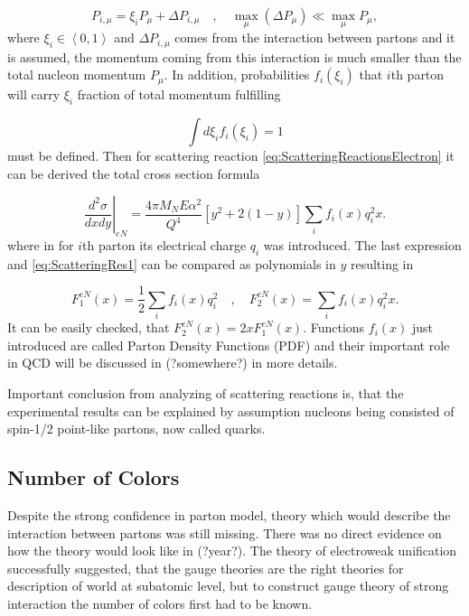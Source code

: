 \documentclass[a4paper,11pt]{report}
\begin{document}
\begin{equation}
  P_{i,\mu} = \xi_i P_\mu + \Delta P_{i,\mu} 
    \quad , \quad \max_\mu (\Delta P_\mu) \ll \max_\mu P_\mu,
  \label{PartonsMomentumDistriburtionAssumption}
\end{equation}
where $\xi_i \in \left< 0, 1 \right>$ and $\Delta P_{i,\mu}$ comes from the
interaction between partons and it is assumed, the momentum coming from this
interaction is much smaller than the total nucleon momentum $P_\mu$. In
addition, probabilities $f_i(\xi_i)$ that $i$th parton will carry $\xi_i$
fraction of total momentum fulfilling

\begin{equation}
  \int d\xi_i f_i(\xi_i) = 1
  \label{PartonDensityFunctionsNormalization}
\end{equation}
must be defined. Then for scattering reaction
\eqref{eq:ScatteringReactionsElectron} it can be derived the total cross section
formula

\begin{equation}
  \left. \frac{d^2\sigma}{dxdy} \right|_{eN} =
  \frac{4 \pi M_N E \alpha^2}{Q^4} \left[ y^2 + 2 ( 1 - y ) \right]
  \sum_i f_i(x) q_i^2 x.
  \label{eg:ScatteringRes2}
\end{equation}
where in for $i$th parton its electrical charge $q_i$ was introduced. The last
expression and \eqref{eq:ScatteringRes1} can be compared as polynomials in $y$
resulting in

\begin{equation}
  F_1^{eN}(x) = \frac{1}{2} \sum_i f_i(x)q_i^2
  \quad , \quad
  F_2^{eN}(x) = \sum_i f_i(x) q_i^2 x.
  \label{eq:StructureFunctionAndPDF}
\end{equation}
It can be easily checked, that $F_2^{eN}(x) = 2 x F_1^{eN}(x)$. Functions
$f_i(x)$ just introduced are called Parton Density Functions (PDF) and their
important role in QCD will be discussed in (?somewhere?) in more details.

Important conclusion from analyzing of scattering reactions is, that the
experimental results can be explained by assumption nucleons being consisted of
spin-1/2 point-like partons, now called quarks. 

\subsection{Number of Colors}

Despite the strong confidence in parton model, theory which would describe the
interaction between partons was still missing. There was no direct evidence on
how the theory would look like in (?year?). The theory of electroweak
unification successfully suggested, that the gauge theories are the right
theories for description of world at subatomic level, but to construct gauge
theory of strong interaction the number of colors first had to be known.
\end{document}
